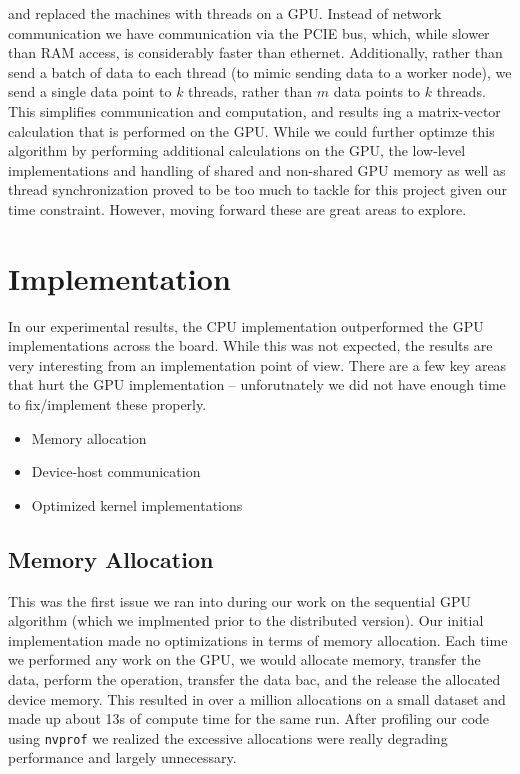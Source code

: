 \documentclass{article}
\begin{document}
and replaced the machines with threads on a GPU. Instead of network
communication we have communication via the PCIE bus, which, while slower than
RAM access, is considerably faster than ethernet. Additionally, rather than send
a batch of data to each thread (to mimic sending data to a worker node), we send
a single data point to $k$ threads, rather than $m$ data points to $k$ threads.
This simplifies communication and computation, and results ing a matrix-vector
calculation that is performed on the GPU. While we could further optimze this
algorithm by performing additional calculations on the GPU, the low-level
implementations and handling of shared and non-shared GPU memory as well as
thread synchronization proved to be too much to tackle for this project given
our time constraint. However, moving forward these are great areas to explore.

\section{Implementation}
In our experimental results,
the CPU implementation outperformed
the GPU implementations across the board. While this was not expected, the
results are very interesting from an implementation point of view. There are a
few key areas that hurt the GPU implementation -- unforutnately we did not have
enough time to fix/implement these properly.
\begin{itemize}
	\item Memory allocation
	\item Device-host communication
	\item Optimized kernel implementations
\end{itemize}

\subsection{Memory Allocation}
This was the first issue we ran into during our work on the sequential GPU
algorithm (which we implmented prior to the distributed version). Our initial
implementation made no optimizations in terms of memory allocation. Each time
we performed any work on the GPU, we would allocate memory, transfer the data,
perform the operation, transfer the data bac, and the release the allocated
device memory. This resulted in over a million allocations on a small dataset
and made up about 13s of compute time for the same run. After profiling our
code using \texttt{nvprof} we realized the excessive allocations were really
degrading performance and largely unnecessary.\\
\end{document}
